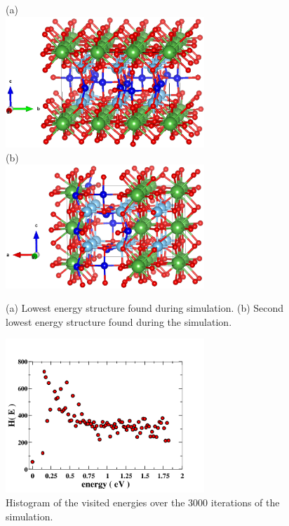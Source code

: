 \documentclass[aps,pre,reprint,superscriptaddress,showkeys]{revtex4-1}
\begin{document}
\begin{figure}
(a)\\
\includegraphics[width=7.5cm]{./figures/it326_run6_lowest_en.eps}\\
(b)\\
\includegraphics[width=7.5cm]{./figures/it1575_run1_second_lowest_en.eps}
\caption{(a) Lowest energy structure found during simulation. (b) Second lowest energy structure found during the simulation. \label{lowen_structures}}
\end{figure}

\begin{figure}
\includegraphics[width=7.5cm]{./figures/Htot.png}
\caption{Histogram of the visited energies over the 3000 iterations of the simulation.\label{Htot}}
\end{figure}
\end{document}
